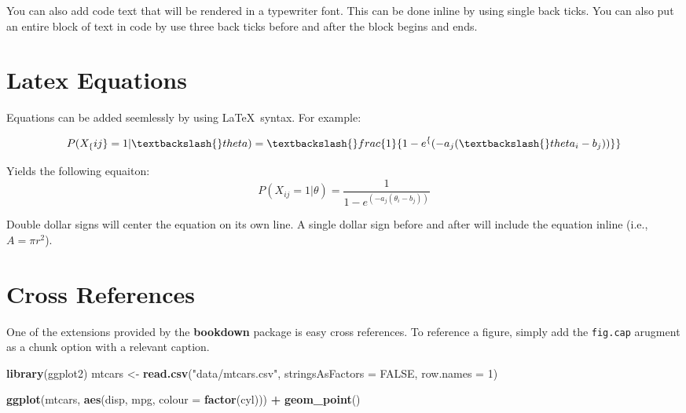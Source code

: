 \documentclass[12pt,english]{kuthesis}
\newenvironment{Shaded}{\begin{snugshade}}{\end{snugshade}}
\newcommand{\KeywordTok}[1]{\textcolor[rgb]{0.13,0.29,0.53}{\textbf{#1}}}
\newcommand{\DataTypeTok}[1]{\textcolor[rgb]{0.13,0.29,0.53}{#1}}
\newcommand{\DecValTok}[1]{\textcolor[rgb]{0.00,0.00,0.81}{#1}}
\newcommand{\StringTok}[1]{\textcolor[rgb]{0.31,0.60,0.02}{#1}}
\newcommand{\OtherTok}[1]{\textcolor[rgb]{0.56,0.35,0.01}{#1}}
\newcommand{\OperatorTok}[1]{\textcolor[rgb]{0.81,0.36,0.00}{\textbf{#1}}}
\newcommand{\NormalTok}[1]{#1}
\begin{document}
You can also add code text that will be rendered in a typewriter font. This can be done inline by using single back ticks. You can also put an entire block of text in code by use three back ticks before and after the block begins and ends.

\hypertarget{latex-equations}{%
\section{Latex Equations}\label{latex-equations}}

Equations can be added seemlessly by using \LaTeX~syntax. For example:

\begin{Shaded}
\begin{Highlighting}[]
\NormalTok{$$}
\NormalTok{P(X_\{ij\} = 1|\textbackslash{}theta) = \textbackslash{}frac\{1\}\{1-e^\{(-a_j (\textbackslash{}theta_i-b_j))\}\}}
\NormalTok{$$}
\end{Highlighting}
\end{Shaded}

Yields the following equaiton:
\[
P(X_{ij} = 1|\theta) = \frac{1}{1-e^{(-a_j (\theta_i-b_j))}}
\]

Double dollar signs will center the equation on its own line. A single dollar sign before and after will include the equation inline (i.e., \(A = \pi r^2\)).

\hypertarget{cross-references}{%
\section{Cross References}\label{cross-references}}

One of the extensions provided by the \textbf{bookdown} package is easy cross references. To reference a figure, simply add the \texttt{fig.cap} arugment as a chunk option with a relevant caption.

\begin{Shaded}
\begin{Highlighting}[]
\KeywordTok{library}\NormalTok{(ggplot2)}
\NormalTok{mtcars <-}\StringTok{ }\KeywordTok{read.csv}\NormalTok{(}\StringTok{"data/mtcars.csv"}\NormalTok{, }\DataTypeTok{stringsAsFactors =} \OtherTok{FALSE}\NormalTok{, }\DataTypeTok{row.names =} \DecValTok{1}\NormalTok{)}

\KeywordTok{ggplot}\NormalTok{(mtcars, }\KeywordTok{aes}\NormalTok{(disp, mpg, }\DataTypeTok{colour =} \KeywordTok{factor}\NormalTok{(cyl))) }\OperatorTok{+}\StringTok{ }
\StringTok{  }\KeywordTok{geom_point}\NormalTok{()}
\end{Highlighting}
\end{Shaded}
\end{document}
